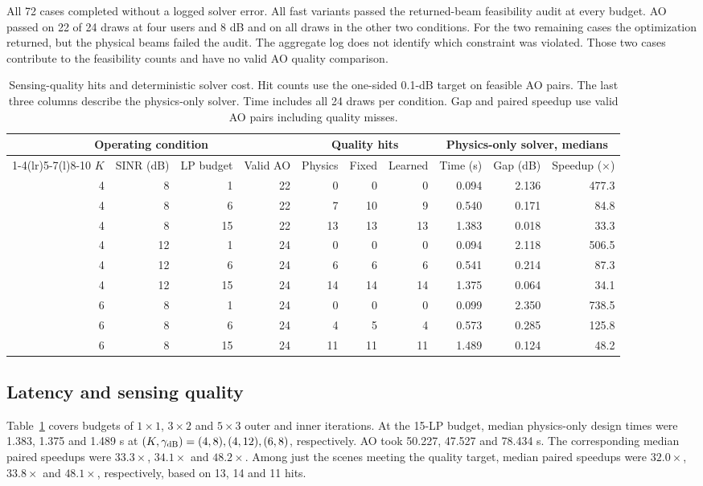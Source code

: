 \documentclass[journal]{IEEEtran}
\begin{document}
All 72 cases completed without a logged solver error. All fast variants passed the returned-beam feasibility audit at every budget. AO passed on 22 of 24 draws at four users and 8 dB and on all draws in the other two conditions. For the two remaining cases the optimization returned, but the physical beams failed the audit. The aggregate log does not identify which constraint was violated. Those two cases contribute to the feasibility counts and have no valid AO quality comparison.

\begin{table}[t]\centering\footnotesize
\caption{Sensing-quality hits and deterministic solver cost. Hit counts use the one-sided 0.1-dB target on feasible AO pairs. The last three columns describe the physics-only solver. Time includes all 24 draws per condition. Gap and paired speedup use valid AO pairs including quality misses.}
\label{tab:mc}
\begin{tabular}{@{}rrrrrrr rrr@{}}
\toprule
\multicolumn{4}{c}{Operating condition} & \multicolumn{3}{c}{Quality hits} &
\multicolumn{3}{c}{Physics-only solver, medians}\\
\cmidrule(lr){1-4}\cmidrule(lr){5-7}\cmidrule(l){8-10}
$K$ & SINR (dB) & LP budget & Valid AO &
Physics & Fixed & Learned & Time (s) & Gap (dB) & Speedup ($\times$)\\
\midrule
4 & 8 & 1 & 22 & 0 & 0 & 0 & 0.094 & 2.136 & 477.3\\
4 & 8 & 6 & 22 & 7 & 10 & 9 & 0.540 & 0.171 & 84.8\\
4 & 8 & 15 & 22 & 13 & 13 & 13 & 1.383 & 0.018 & 33.3\\
\midrule
4 & 12 & 1 & 24 & 0 & 0 & 0 & 0.094 & 2.118 & 506.5\\
4 & 12 & 6 & 24 & 6 & 6 & 6 & 0.541 & 0.214 & 87.3\\
4 & 12 & 15 & 24 & 14 & 14 & 14 & 1.375 & 0.064 & 34.1\\
\midrule
6 & 8 & 1 & 24 & 0 & 0 & 0 & 0.099 & 2.350 & 738.5\\
6 & 8 & 6 & 24 & 4 & 5 & 4 & 0.573 & 0.285 & 125.8\\
6 & 8 & 15 & 24 & 11 & 11 & 11 & 1.489 & 0.124 & 48.2\\
\bottomrule
\end{tabular}
\end{table}

\subsection{Latency and sensing quality}
Table~\ref{tab:mc} covers budgets of $1\times1$, $3\times2$ and $5\times3$ outer and inner iterations. At the 15-LP budget, median physics-only design times were 1.383, 1.375 and 1.489 s at $(K,\gamma_{\rm dB})=(4,8),(4,12),(6,8)$, respectively. AO took 50.227, 47.527 and 78.434 s. The corresponding median paired speedups were $33.3\times$, $34.1\times$ and $48.2\times$. Among just the scenes meeting the quality target, median paired speedups were $32.0\times$, $33.8\times$ and $48.1\times$, respectively, based on 13, 14 and 11 hits.
\end{document}
